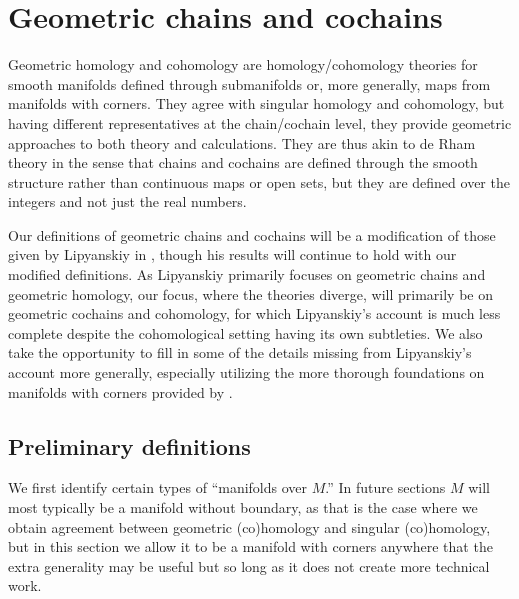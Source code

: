 
\section{Geometric chains and cochains}\label{S: geometric cochains}

Geometric homology and cohomology are homology/cohomology theories for smooth manifolds defined through submanifolds or, more generally, maps from manifolds with corners.
They agree with singular homology and cohomology, but having different representatives
at the chain/cochain level, they provide geometric approaches to both theory and calculations.
They are thus akin to de Rham theory in the sense that chains and cochains are defined through the smooth structure rather than continuous maps or open sets, but they are defined over the integers and not just the real numbers.

Our definitions of geometric chains and cochains will be a modification of those given by Lipyanskiy in \cite{Lipy14}, though his results will continue to hold with our modified definitions.
As Lipyanskiy primarily focuses on geometric chains and geometric homology, our focus, where the theories diverge, will primarily be on geometric cochains and cohomology, for which Lipyanskiy's account is much less complete despite the cohomological setting having its own subtleties.
We also take the opportunity to fill in some of the details missing from Lipyanskiy's account more generally, especially utilizing the more thorough foundations on manifolds with corners provided by \cite{Joy12,MaDo92}.

\subsection{Preliminary definitions}

We first identify certain types of ``manifolds over $M$.'' In future sections $M$ will most typically be a manifold without boundary, as that is the case where we obtain agreement between geometric (co)homology and singular (co)homology, but in this section we allow it to be a manifold with corners anywhere that the extra generality may be useful but so long as it does not create more technical work.


